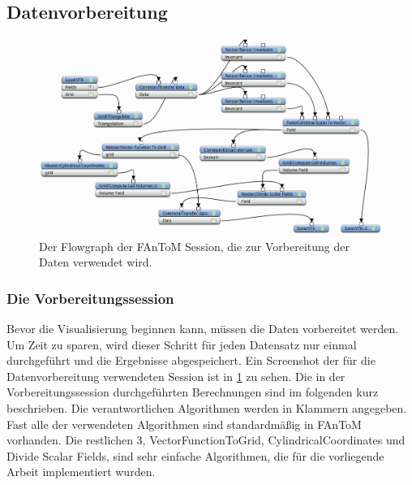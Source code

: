 \documentclass[a4paper,fontsize=12pt,toc=bib,parskip=half,ngerman]{scrartcl}
\begin{document}
\subsection{Datenvorbereitung}
\begin{figure}
	\centering
	\includegraphics[width=\textwidth]{pictures/BigSession.png}
	\caption{Der Flowgraph der FAnToM Session, die zur Vorbereitung der Daten verwendet wird.}
	\label{BigSession}
\end{figure}

\subsubsection{Die Vorbereitungssession}
\label{sec:Vorverarbeitung}
Bevor die Visualisierung beginnen kann, m\"ussen die Daten vorbereitet werden. Um Zeit zu sparen, wird dieser Schritt f\"ur jeden Datensatz nur einmal durchgef\"uhrt und die Ergebnisse abgespeichert. Ein Screenshot der f\"ur die Datenvorbereitung verwendeten Session ist in \cref{BigSession} zu sehen. Die in der Vorbereitungssession durchgef\"uhrten Berechnungen sind im folgenden kurz beschrieben. Die verantwortlichen Algorithmen werden in Klammern angegeben. Fast alle der verwendeten Algorithmen sind standardm\"a{\ss}ig in FAnToM vorhanden. Die restlichen 3, \glq VectorFunctionToGrid\grq{}, \glq CylindricalCoordinates\grq{} und \glq Divide Scalar Fields\grq{}, sind sehr einfache Algorithmen, die f\"ur die vorliegende Arbeit implementiert wurden.
\end{document}
